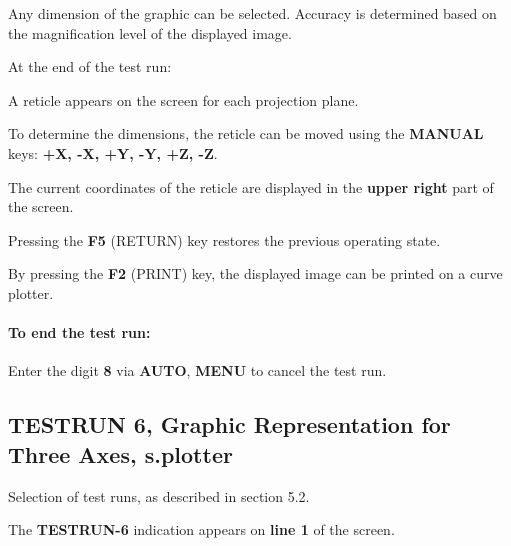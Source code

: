 Any dimension of the graphic can be selected.  
Accuracy is determined based on the magnification level of the displayed image.

\procedure

At the end of the test run:

\begin{itemize}
\end{itemize}

\vspace{.5cm}

A reticle appears on the screen for each projection plane.

To determine the dimensions, the reticle can be moved using the \textbf{MANUAL} keys:  
\textbf{+X, -X, +Y, -Y, +Z, -Z}.

The current coordinates of the reticle are displayed in the \textbf{upper right} part of the screen.

Pressing the \textbf{F5} (RETURN) key restores the previous operating state.

By pressing the \textbf{F2} (PRINT) key, the displayed image can be printed on a curve plotter.

\paragraph{To end the test run:}

\begin{itemize}
\end{itemize}

\vspace{.5cm}

Enter the digit \textbf{8} via \textbf{AUTO}, \textbf{MENU} to cancel the test run.

\subsection{TESTRUN 6, Graphic Representation for Three Axes, s.plotter}

Selection of test runs, as described in section 5.2.

\begin{itemize}
\end{itemize}

\vspace{.5cm}

The \textbf{TESTRUN-6} indication appears on \textbf{line 1} of the screen.

